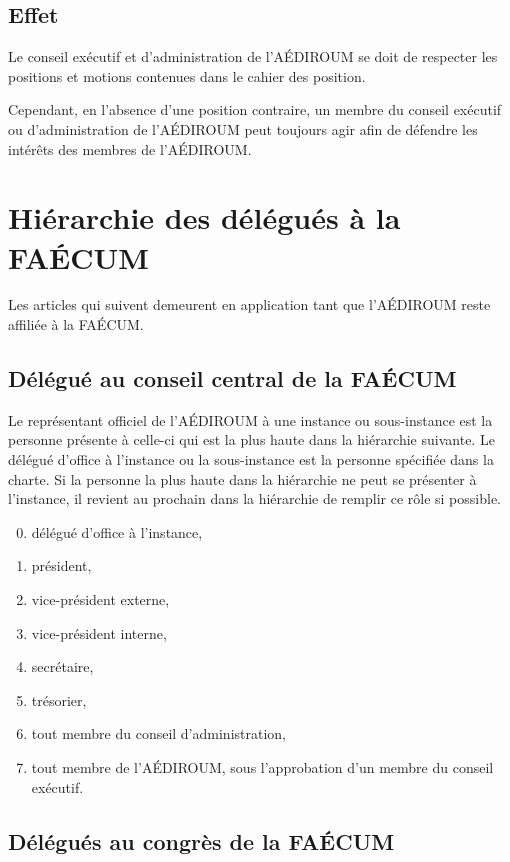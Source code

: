 \documentclass[12pt]{article}
\begin{document}
\subsection{Effet}

Le conseil exécutif et d’administration de l’AÉDIROUM se doit de respecter les positions et motions contenues dans le cahier des position.

Cependant, en l’absence d’une position contraire, un membre du conseil exécutif ou d’administration de l’AÉDIROUM peut toujours agir afin de défendre les intérêts des membres de l’AÉDIROUM.

\section{Hiérarchie des délégués à la FAÉCUM}

Les articles qui suivent demeurent en application tant que l'AÉDIROUM reste affiliée à la FAÉCUM.

\subsection{Délégué au conseil central de la FAÉCUM}

Le représentant officiel de l'AÉDIROUM à une instance ou sous-instance est la personne présente à celle-ci qui est la plus haute dans la hiérarchie suivante. Le délégué d’office à l’instance ou la sous-instance est la personne spécifiée dans la charte. Si la personne la plus haute
dans la hiérarchie ne peut se présenter à l’instance, il revient au prochain dans la
hiérarchie de remplir ce rôle si possible.
  \begin{enumerate}\setcounter{enumi}{-1}
  \item délégué d'office à l'instance,
  \item président,
  \item vice-président externe,
  \item vice-président interne,
  \item secrétaire,
  \item trésorier,
  \item tout membre du conseil d'administration,
  \item tout membre de l'AÉDIROUM, sous l'approbation d'un membre du conseil exécutif.
  \end{enumerate}

\subsection{Délégués au congrès de la FAÉCUM}
\end{document}
